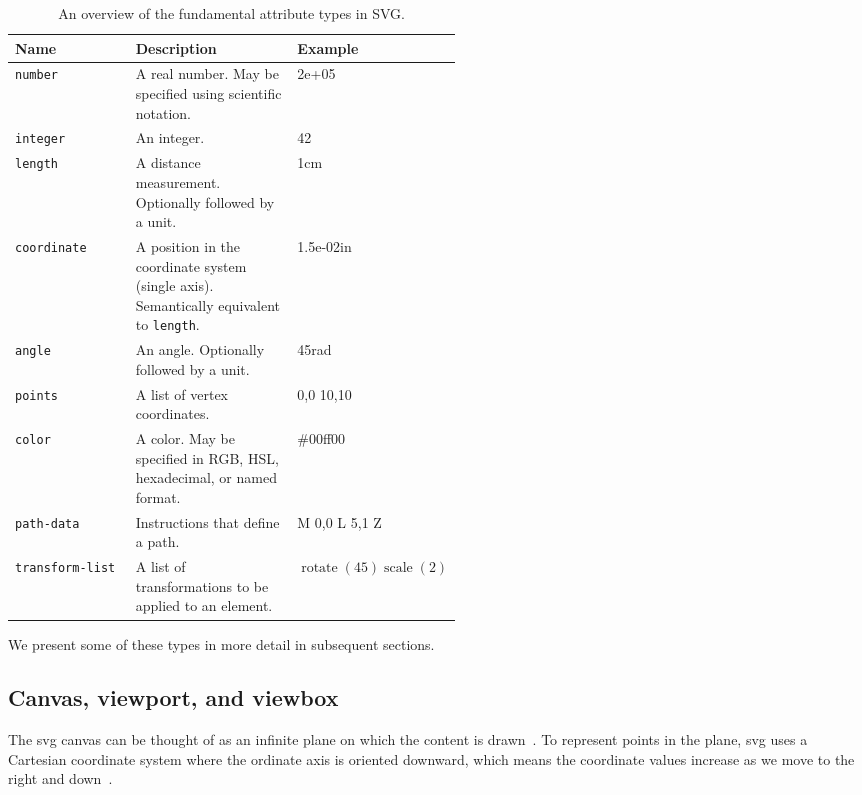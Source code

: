 \begin{table}[hbtp]
    \centering

    \begin{threeparttable}
        \begin{tabularx}{\linewidth}{p{0.275\linewidth}Xp{0.25\linewidth}}
            \toprule
            \textbf{Name} & \textbf{Description} & \textbf{Example} \\
            \midrule
            \texttt{number} & A real number. May be specified using scientific notation. & 2e+05 \\
            \texttt{integer} & An integer. & 42 \\
            \texttt{length} & A distance measurement. Optionally followed by a unit. & 1cm \\
            \texttt{coordinate} & A position in the coordinate system (single axis). Semantically equivalent to \texttt{length}. & 1.5e-02in \\
            \texttt{angle} & An angle. Optionally followed by a unit. & 45rad \\
            \texttt{points} & A list of vertex coordinates. & 0,0 10,10 \\
            \texttt{color} & A color. May be specified in RGB, HSL, hexadecimal, or named format. & \#00ff00 \\
            \texttt{path-data} & Instructions that define a path. & M 0,0 L 5,1 Z \\
            \texttt{transform-list} & A list of transformations to be applied to an element. & $\operatorname{rotate}(45)\operatorname{scale}(2)$ \\
            \bottomrule
      \end{tabularx}
      
      \caption{An overview of the fundamental attribute types in SVG.}
      \label{table:attr-types}
    \end{threeparttable}
\end{table}

We present some of these types in more detail in subsequent sections.

\subsection{Canvas, viewport, and viewbox}

The \gls{svg} canvas can be thought of as an infinite plane on which the content is drawn~\cite[Sec.~7.1]{svg11}. To represent points in the plane, \gls{svg} uses a Cartesian coordinate system where the ordinate axis is oriented downward, which means the coordinate values increase as we move to the right and down~\cite[Sec.~7.3]{svg11}.

